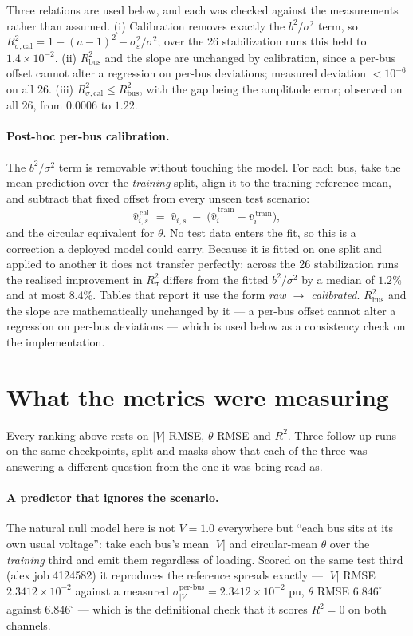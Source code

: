 \documentclass[10pt]{article}
\begin{document}
Three relations are used below, and each was checked against the measurements
rather than assumed.  (i) Calibration removes exactly the $b^2/\sigma^2$ term,
so $R^2_{\sigma,\mathrm{cal}} = 1-(a-1)^2-\sigma_\varepsilon^2/\sigma^2$; over
the 26 stabilization runs this held to $1.4\times10^{-2}$.  (ii)
$R^2_{\mathrm{bus}}$ and the slope are unchanged by calibration, since a
per-bus offset cannot alter a regression on per-bus deviations; measured
deviation $<10^{-6}$ on all 26.  (iii) $R^2_{\sigma,\mathrm{cal}} \le
R^2_{\mathrm{bus}}$, with the gap being the amplitude error; observed on all
26, from $0.0006$ to $1.22$.

\paragraph{Post-hoc per-bus calibration.}  The $b^2/\sigma^2$ term is removable
without touching the model.  For each bus, take the mean prediction over the
\emph{training} split, align it to the training reference mean, and subtract
that fixed offset from every unseen test scenario:
\[
  \hat v^{\,\mathrm{cal}}_{i,s} \;=\; \hat v_{i,s}
  \;-\;\bigl(\overline{\hat v}^{\,\mathrm{train}}_{i}-\bar v^{\,\mathrm{train}}_{i}\bigr),
\]
and the circular equivalent for $\theta$.  No test data enters the fit, so this
is a correction a deployed model could carry.  Because it is fitted on one
split and applied to another it does not transfer perfectly: across the 26
stabilization runs the realised improvement in $R^2_{\sigma}$ differs from the
fitted $b^2/\sigma^2$ by a median of $1.2\%$ and at most $8.4\%$.  Tables that
report it use the form \emph{raw $\to$ calibrated}.  $R^2_{\mathrm{bus}}$ and the slope are
mathematically unchanged by it --- a per-bus offset cannot alter a regression
on per-bus deviations --- which is used below as a consistency check on the
implementation.

\section{What the metrics were measuring}
\label{sec:metrology}

Every ranking above rests on $|V|$ RMSE, $\theta$ RMSE and $R^2$.  Three
follow-up runs on the same checkpoints, split and masks show that each of the
three was answering a different question from the one it was being read as.

\paragraph{A predictor that ignores the scenario.}  The natural null model here
is not $V=1.0$ everywhere but ``each bus sits at its own usual voltage'': take
each bus's mean $|V|$ and circular-mean $\theta$ over the \emph{training} third
and emit them regardless of loading.  Scored on the same test third (alex job
4124582) it reproduces the reference spreads exactly --- $|V|$ RMSE
$2.3412\times10^{-2}$ against a measured
$\sigma_{|V|}^{\text{per-bus}}=2.3412\times10^{-2}$ pu, $\theta$ RMSE
$6.846^\circ$ against $6.846^\circ$ --- which is the definitional check that it
scores $R^2=0$ on both channels.
\end{document}
